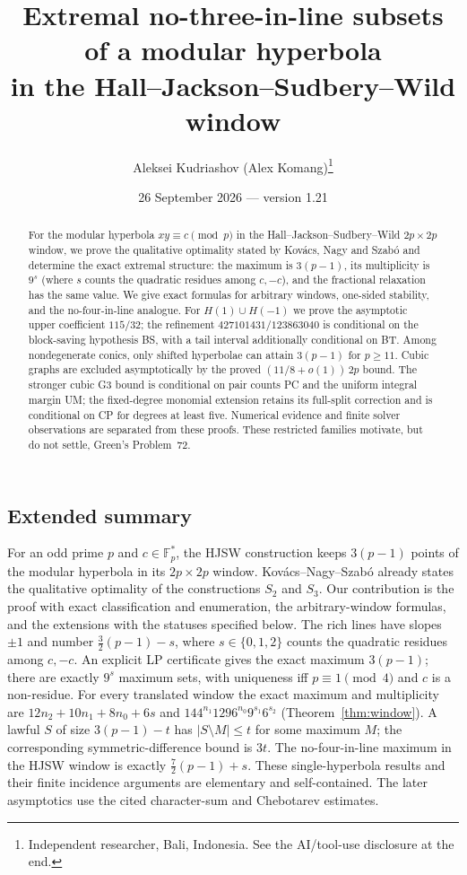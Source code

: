 \documentclass[11pt]{article}
\title{Extremal no-three-in-line subsets of a modular hyperbola\\ in the Hall--Jackson--Sudbery--Wild window}
\author{Aleksei Kudriashov (Alex Komang)\thanks{Independent researcher, Bali, Indonesia.  See the AI/tool-use disclosure at the end.}}
\date{26 September 2026 --- version 1.21}
\theoremstyle{remark}
\newcommand{\Fp}{\mathbb{F}_p}
\begin{document}
\maketitle

\begin{abstract}
For the modular hyperbola $xy\equiv c\pmod p$ in the Hall--Jackson--Sudbery--Wild $2p\times2p$ window,
we prove the qualitative optimality stated by Kov\'acs, Nagy and Szab\'o and determine the exact extremal structure:
the maximum is $3(p-1)$, its multiplicity is $9^s$ (where $s$ counts the quadratic residues among $c,-c$), and the fractional relaxation has the same value.
We give exact formulas for arbitrary windows, one-sided stability, and the no-four-in-line analogue.
For $H(1)\cup H(-1)$ we prove the asymptotic upper coefficient $115/32$; the refinement $427101431/123863040$
is conditional on the block-saving hypothesis BS, with a tail interval additionally conditional on BT.
Among nondegenerate conics, only shifted hyperbolae can attain $3(p-1)$ for $p\ge11$.
Cubic graphs are excluded asymptotically by the proved $(11/8+o(1))\,2p$ bound.
The stronger cubic G3 bound is conditional on pair counts PC and the uniform integral margin UM;
the fixed-degree monomial extension retains its full-split correction and is conditional on CP for degrees at least five.
Numerical evidence and finite solver observations are separated from these proofs.  These restricted families motivate, but do not settle, Green's Problem~72.
\end{abstract}

\subsection*{Extended summary}
For an odd prime $p$ and $c\in\Fp^*$, the HJSW construction keeps $3(p-1)$ points of the modular hyperbola in its $2p\times2p$ window.
Kov\'acs--Nagy--Szab\'o \cite[Appendix A]{KNS25} already states the qualitative optimality of the constructions $S_2$ and $S_3$.
Our contribution is the proof with exact classification and enumeration, the arbitrary-window formulas, and the extensions with the statuses specified below.
The rich lines have slopes $\pm1$ and number $\tfrac32(p-1)-s$, where $s\in\{0,1,2\}$ counts the quadratic residues among $c,-c$.
An explicit LP certificate gives the exact maximum $3(p-1)$; there are exactly $9^s$ maximum sets,
with uniqueness iff $p\equiv1\pmod4$ and $c$ is a non-residue.
For every translated window the exact maximum and multiplicity are
$12n_2+10n_1+8n_0+6s$ and $144^{n_1}1296^{n_0}9^{s_1}6^{s_2}$ (Theorem~\ref{thm:window}).
A lawful $S$ of size $3(p-1)-t$ has $|S\setminus M|\le t$ for some maximum $M$; the corresponding symmetric-difference bound is $3t$.
The no-four-in-line maximum in the HJSW window is exactly $\tfrac72(p-1)+s$.
These single-hyperbola results and their finite incidence arguments are elementary and self-contained.
The later asymptotics use the cited character-sum and Chebotarev estimates.
\end{document}
